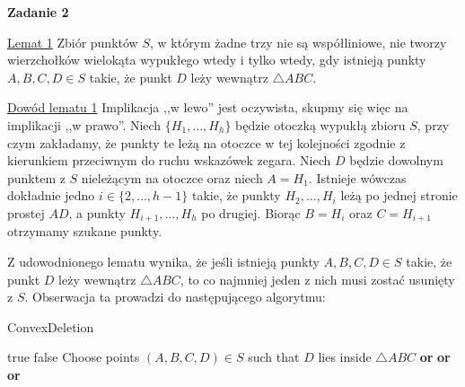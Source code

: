 \documentclass[12pt]{article}
\begin{document}
	\newpage
	
	\textbf{Zadanie 2}
	
	\medskip
	
	\underline{Lemat 1} Zbiór punktów \(S\), w którym żadne trzy nie są
	współliniowe, nie tworzy wierzchołków wielokąta wypukłego wtedy i tylko
	wtedy, gdy istnieją punkty \(A, B, C, D \in S\) takie, że punkt \(D\) leży
	wewnątrz \(\triangle ABC\).
	
	\medskip
	
	\underline{Dowód lematu 1} Implikacja ,,w lewo'' jest oczywista, skupmy się
	więc na implikacji ,,w prawo''. Niech \(\{H_{1}, \ldots, H_{h}\}\) będzie
	otoczką wypukłą zbioru \(S\), przy czym zakładamy, że punkty te leżą na
	otoczce w tej kolejności zgodnie z kierunkiem przeciwnym do ruchu wskazówek
	zegara. Niech \(D\) będzie dowolnym punktem z \(S\) nieleżącym na otoczce
	oraz niech \(A = H_{1}\). Istnieje wówczas dokładnie jedno \(i \in \{2,
	\ldots, h - 1\}\) takie, że punkty \(H_{2}, \ldots, H_{i}\) leżą po jednej
	stronie prostej \(AD\), a punkty \(H_{i + 1}, \ldots, H_{h}\) po drugiej.
	Biorąc \(B = H_{i}\) oraz \(C = H_{i + 1}\) otrzymamy szukane punkty.
	
	\medskip
	
	Z udowodnionego lematu wynika, że jeśli istnieją punkty \(A, B, C, D \in S\)
	takie, że punkt \(D\) leży wewnątrz \(\triangle ABC\), to co najmniej jeden
	z nich musi zostać usunięty z \(S\). Obserwacja ta prowadzi do następującego
	algorytmu:
	
	\begin{algorithm}
		\caption{ConvexDeletion}
		\begin{algorithmic}[1]
			        \State \Return true
			    \EndIf
			        \State \Return false
			    \EndIf
			    \State Choose points $(A, B, C, D) \in S$ such that $D$ lies
			           inside $\triangle ABC$
			    \State \Return {}
			           \textbf{or}
			           \textbf{or}
			    \Statex \hspace{4.685em}
			           \textbf{or}
			\EndProcedure
		\end{algorithmic}
	\end{algorithm}
	
\end{document}
